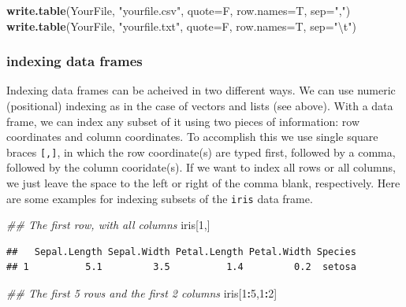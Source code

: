 \documentclass[]{book}
\newenvironment{Shaded}{\begin{snugshade}}{\end{snugshade}}
\newcommand{\CharTok}[1]{\textcolor[rgb]{0.31,0.60,0.02}{#1}}
\newcommand{\CommentTok}[1]{\textcolor[rgb]{0.56,0.35,0.01}{\textit{#1}}}
\newcommand{\DataTypeTok}[1]{\textcolor[rgb]{0.13,0.29,0.53}{#1}}
\newcommand{\DecValTok}[1]{\textcolor[rgb]{0.00,0.00,0.81}{#1}}
\newcommand{\KeywordTok}[1]{\textcolor[rgb]{0.13,0.29,0.53}{\textbf{#1}}}
\newcommand{\NormalTok}[1]{#1}
\newcommand{\OperatorTok}[1]{\textcolor[rgb]{0.81,0.36,0.00}{\textbf{#1}}}
\newcommand{\StringTok}[1]{\textcolor[rgb]{0.31,0.60,0.02}{#1}}
\begin{document}
\begin{Shaded}
\begin{Highlighting}[]
\KeywordTok{write.table}\NormalTok{(YourFile, }\StringTok{"yourfile.csv"}\NormalTok{, }\DataTypeTok{quote=}\NormalTok{F, }\DataTypeTok{row.names=}\NormalTok{T, }\DataTypeTok{sep=}\StringTok{","}\NormalTok{)}
\KeywordTok{write.table}\NormalTok{(YourFile, }\StringTok{"yourfile.txt"}\NormalTok{, }\DataTypeTok{quote=}\NormalTok{F, }\DataTypeTok{row.names=}\NormalTok{T, }\DataTypeTok{sep=}\StringTok{"}\CharTok{\textbackslash{}t}\StringTok{"}\NormalTok{)}
\end{Highlighting}
\end{Shaded}

\hypertarget{indexing-data-frames}{%
\subsubsection{indexing data frames}\label{indexing-data-frames}}

Indexing data frames can be acheived in two different ways. We can use numeric (positional) indexing as in the case of vectors and lists (see above). With a data frame, we can index any subset of it using two pieces of information: row coordinates and column coordinates. To accomplish this we use single square braces \texttt{{[},{]}}, in which the row coordinate(s) are typed first, followed by a comma, followed by the column cooridate(s). If we want to index all rows or all columns, we just leave the space to the left or right of the comma blank, respectively. Here are some examples for indexing subsets of the \texttt{iris} data frame.

\begin{Shaded}
\begin{Highlighting}[]
\CommentTok{## The first row, with all columns}
\NormalTok{iris[}\DecValTok{1}\NormalTok{,]}
\end{Highlighting}
\end{Shaded}

\begin{verbatim}
##   Sepal.Length Sepal.Width Petal.Length Petal.Width Species
## 1          5.1         3.5          1.4         0.2  setosa
\end{verbatim}

\begin{Shaded}
\begin{Highlighting}[]
\CommentTok{## The first 5 rows and the first 2 columns}
\NormalTok{iris[}\DecValTok{1}\OperatorTok{:}\DecValTok{5}\NormalTok{,}\DecValTok{1}\OperatorTok{:}\DecValTok{2}\NormalTok{]}
\end{Highlighting}
\end{Shaded}
\end{document}
